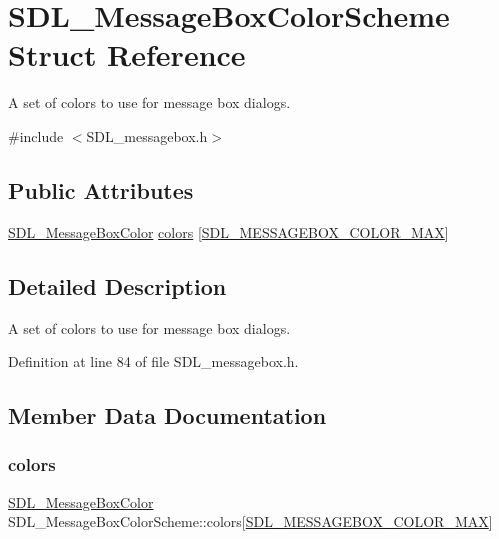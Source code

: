 \hypertarget{struct_s_d_l___message_box_color_scheme}{}\section{S\+D\+L\+\_\+\+Message\+Box\+Color\+Scheme Struct Reference}
\label{struct_s_d_l___message_box_color_scheme}


A set of colors to use for message box dialogs.  




{\ttfamily \#include $<$S\+D\+L\+\_\+messagebox.\+h$>$}

\subsection*{Public Attributes}
\begin{DoxyCompactItemize}
\item 
\mbox{\hyperlink{struct_s_d_l___message_box_color}{S\+D\+L\+\_\+\+Message\+Box\+Color}} \mbox{\hyperlink{struct_s_d_l___message_box_color_scheme_ae3712ec81e41b63b781b7d49d3b3b8f6}{colors}} \mbox{[}\mbox{\hyperlink{_s_d_l__messagebox_8h_a75e562d38bc214725e01f4f829bc1567a0a575b056603e38e844b141c83a44d89}{S\+D\+L\+\_\+\+M\+E\+S\+S\+A\+G\+E\+B\+O\+X\+\_\+\+C\+O\+L\+O\+R\+\_\+\+M\+AX}}\mbox{]}
\end{DoxyCompactItemize}


\subsection{Detailed Description}
A set of colors to use for message box dialogs. 

Definition at line 84 of file S\+D\+L\+\_\+messagebox.\+h.



\subsection{Member Data Documentation}
\mbox{\label{struct_s_d_l___message_box_color_scheme_ae3712ec81e41b63b781b7d49d3b3b8f6}} 
\subsubsection{\texorpdfstring{colors}{colors}}
{\footnotesize\ttfamily \mbox{\hyperlink{struct_s_d_l___message_box_color}{S\+D\+L\+\_\+\+Message\+Box\+Color}} S\+D\+L\+\_\+\+Message\+Box\+Color\+Scheme\+::colors\mbox{[}\mbox{\hyperlink{_s_d_l__messagebox_8h_a75e562d38bc214725e01f4f829bc1567a0a575b056603e38e844b141c83a44d89}{S\+D\+L\+\_\+\+M\+E\+S\+S\+A\+G\+E\+B\+O\+X\+\_\+\+C\+O\+L\+O\+R\+\_\+\+M\+AX}}\mbox{]}}



